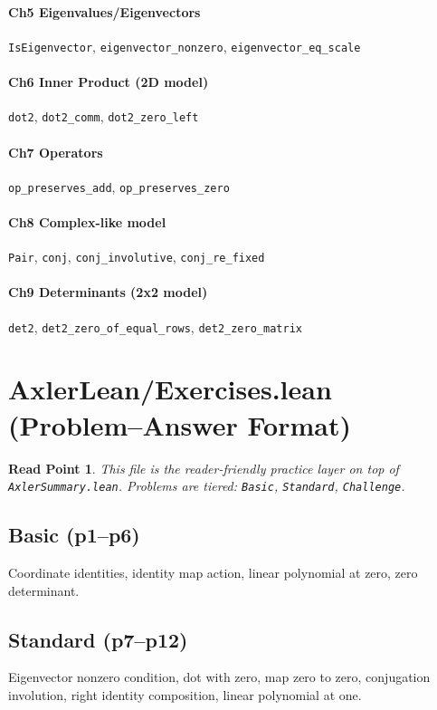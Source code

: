 \documentclass[11pt]{article}
\newtheorem*{readpoint}{Read Point}
\begin{document}
\paragraph{Ch5 Eigenvalues/Eigenvectors}
\texttt{IsEigenvector}, \texttt{eigenvector\_nonzero}, \texttt{eigenvector\_eq\_scale}

\paragraph{Ch6 Inner Product (2D model)}
\texttt{dot2}, \texttt{dot2\_comm}, \texttt{dot2\_zero\_left}

\paragraph{Ch7 Operators}
\texttt{op\_preserves\_add}, \texttt{op\_preserves\_zero}

\paragraph{Ch8 Complex-like model}
\texttt{Pair}, \texttt{conj}, \texttt{conj\_involutive}, \texttt{conj\_re\_fixed}

\paragraph{Ch9 Determinants (2x2 model)}
\texttt{det2}, \texttt{det2\_zero\_of\_equal\_rows}, \texttt{det2\_zero\_matrix}

\section{AxlerLean/Exercises.lean (Problem--Answer Format)}
\begin{readpoint}
This file is the reader-friendly practice layer on top of \texttt{AxlerSummary.lean}.
Problems are tiered:
\texttt{Basic}, \texttt{Standard}, \texttt{Challenge}.
\end{readpoint}

\subsection*{Basic (p1--p6)}
Coordinate identities, identity map action, linear polynomial at zero, zero determinant.

\subsection*{Standard (p7--p12)}
Eigenvector nonzero condition, dot with zero, map zero to zero, conjugation involution,
right identity composition, linear polynomial at one.
\end{document}

